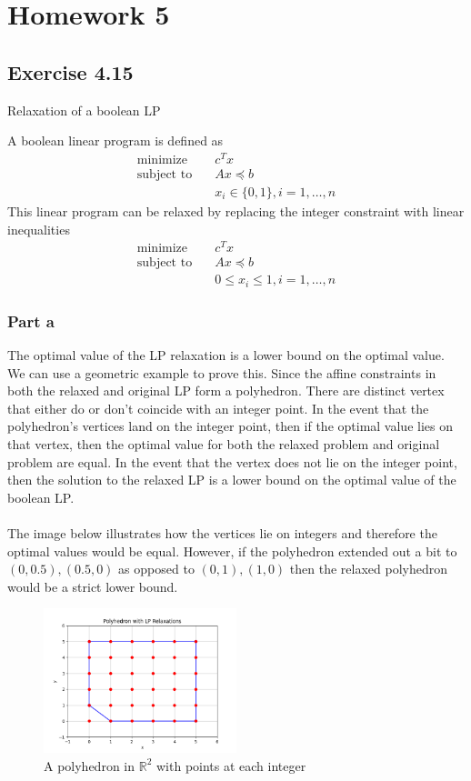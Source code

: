 \section{Homework 5}
\subsection{Exercise 4.15}

Relaxation of a boolean LP

A boolean linear program is defined as 
\begin{align}
  \text{minimize} & \quad c^T x \\
  \text{subject to} & \quad Ax \preceq b \\
  & \quad x_i \in \{ 0,1\}, i = 1, \dots, n 
\end{align}
This linear program can be relaxed by replacing the integer constraint with linear inequalities
\begin{align}
  \text{minimize} & \quad c^T x \\
  \text{subject to} & \quad Ax \preceq b \\
  & \quad 0 \leq x_i \leq 1, i = 1,\dots,n
\end{align} 
\subsubsection{Part a}
The optimal value of the LP relaxation is a lower bound on the optimal value. We can use a geometric example to prove this. Since the affine constraints in both the relaxed and original LP form a polyhedron. There are distinct vertex that either do or don't coincide with an integer point. In the event that the polyhedron's vertices land on the integer point, then if the optimal value lies on that vertex, then the optimal value for both the relaxed problem and original problem are equal. In the event that the vertex does not lie on the integer point, then the solution to the relaxed LP is a lower bound on the optimal value of the boolean LP.  \\ \\
The image below illustrates how the vertices lie on integers and therefore the optimal values would be equal. However, if the polyhedron extended out a bit to $(0,0.5),(0.5,0)$ as opposed to $(0,1),(1,0)$ then the relaxed polyhedron would be a strict lower bound.
\begin{figure}[htbp]
  \centerline{\includegraphics[width=0.50\textwidth]{hw5/lp_relaxed_polyhedron.png}}
  \caption{A polyhedron in $\mathbb{R}^2$ with points at each integer}
  \label{fig:lp_relaxed_polyhedron}
\end{figure} 
